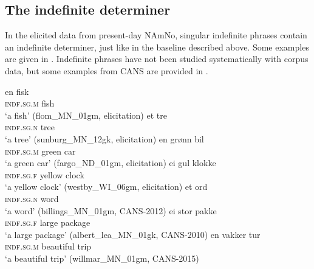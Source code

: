 \documentclass[output=paper]{langscibook}
\begin{document}
\subsection{The indefinite determiner} \label{Sect-IndefArt}
In the elicited data from present-day NAmNo, singular indefinite phrases contain an indefinite determiner, just like in the baseline described above. Some examples are given in . Indefinite phrases have not been studied systematically with corpus data, but some examples from CANS are provided in . 
 

\ea\label{ex:vanbaal:18}
\ea \label{ex:vanbaal:18a}
\gll en fisk \\
    \textsc{indf.sg.m} fish \\
\glt `a fish' (flom\_MN\_01gm, elicitation)
\ex \label{ex:vanbaal:18b}
\gll et tre \\
    \textsc{indf.sg.n} tree \\
\glt `a tree' (sunburg\_MN\_12gk, elicitation)
\ex \label{ex:vanbaal:18c}
\gll en grønn bil \\
    \textsc{indf.sg.m} green car \\
\glt `a green car' (fargo\_ND\_01gm, elicitation)
\ex \label{ex:vanbaal:18d}
\gll ei gul klokke \\
    \textsc{indf.sg.f} yellow clock \\
\glt `a yellow clock' (westby\_WI\_06gm, elicitation)
\z
\ex \label{ex:vanbaal:19}
\ea \label{ex:vanbaal:19a}
\gll et ord \\
    \textsc{indf.sg.n} word \\
\glt `a word' (billings\_MN\_01gm, CANS-2012)
\ex \label{ex:vanbaal:19b}
\gll ei stor pakke \\
    \textsc{indf.sg.f} large package \\
\glt `a large package' (albert\_lea\_MN\_01gk, CANS-2010)
\ex \label{ex:vanbaal:19c}
\gll en vakker tur \\ 
    \textsc{indf.sg.m} beautiful trip \\
\glt `a beautiful trip' (willmar\_MN\_01gm, CANS-2015)
\z
\z
\end{document}
